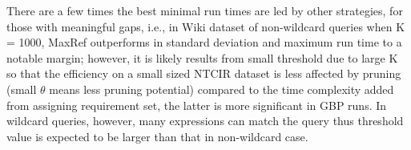 \documentclass[runningheads]{llncs}
\begin{document}
There are a few times the best minimal run times are led by other strategies, for those with meaningful gaps, i.e., in Wiki dataset of non-wildcard queries when K = 1000, MaxRef outperforms in standard deviation and maximum run time to a notable margin; however, it is likely results from small threshold due to large K so that the efficiency on a small sized NTCIR dataset is less affected by pruning (small $\theta$ means less pruning potential) compared to the time complexity added from assigning requirement set, the latter is more significant in GBP runs. In wildcard queries, however, many expressions can match the query thus threshold value is expected to be larger than that in non-wildcard case.
\begin{figure}[!t]
\begin{center}

\hspace*{-3.6cm} 


\end{center}
\end{figure}
\end{document}
